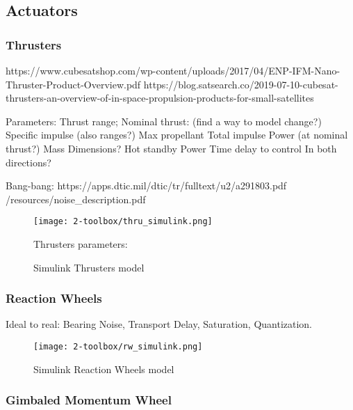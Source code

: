 \subsection{Actuators}

    \subsubsection{Thrusters}
        https://www.cubesatshop.com/wp-content/uploads/2017/04/ENP-IFM-Nano-Thruster-Product-Overview.pdf
        https://blog.satsearch.co/2019-07-10-cubesat-thrusters-an-overview-of-in-space-propulsion-products-for-small-satellites

        Parameters:
            Thrust range;
            Nominal thrust: (find a way to model change?)
            Specific impulse (also ranges?)
            Max propellant
            Total impulse
            Power (at nominal thrust?)
            Mass
            Dimensions?
            Hot standby Power
            Time delay to control
            In both directions? 

        Bang-bang: https://apps.dtic.mil/dtic/tr/fulltext/u2/a291803.pdf
        /resources/noise_description.pdf

        \begin{figure}[hb]
            \centering
            \texttt{[image: 2-toolbox/thru\_simulink.png]}
            \caption{Simulink Thrusters model}
            \label{fig:thru_simulink}
            Thrusters parameters: 
        \end{figure}

    \subsubsection{Reaction Wheels}
        Ideal to real: Bearing Noise, Transport Delay, Saturation, Quantization.
        
        \begin{figure}[hb]
            \centering
            \texttt{[image: 2-toolbox/rw\_simulink.png]}
            \caption{Simulink Reaction Wheels model}
            \label{fig:rw_simulink}
        \end{figure}
        \subsubsection{Gimbaled Momentum Wheel}